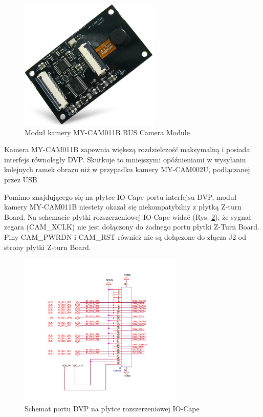  \begin{figure}[!h]
      \centering
      \includegraphics[width=0.6\textwidth]{img/my-cam011b.png}
      \caption{Moduł kamery MY-CAM011B BUS Camera Module}
      \label{cam-dvp}
    \end{figure}

Kamera MY-CAM011B zapewnia większą rozdzielczość maksymalną i posiada interfejs równoległy DVP. Skutkuje to mniejszymi opóźnieniami w wysyłaniu kolejnych ramek obrazu niż w przypadku kamery MY-CAM002U, podłączanej przez USB. 

Pomimo znajdującego się na płytce IO-Cape portu interfejsu DVP, moduł kamery MY-CAM011B niestety okazał się niekompatybilny z płytką Z-turn Board. Na schemacie płytki rozszerzeniowej IO-Cape widać (Rys. \ref{cam-schematic}), że sygnał zegara (CAM\_XCLK) nie jest dołączony do żadnego portu płytki Z-Turn Board. Piny CAM\_PWRDN i CAM\_RST również nie są dołączone do złącza J2 od strony płytki Z-turn Board. 

\begin{figure}[!h]
  \centering
  \includegraphics[width=0.7\textwidth]{img/cam-schematic.png}
  \caption{Schemat portu DVP na płytce rozszerzeniowej IO-Cape}
  \label{cam-schematic}
\end{figure}

